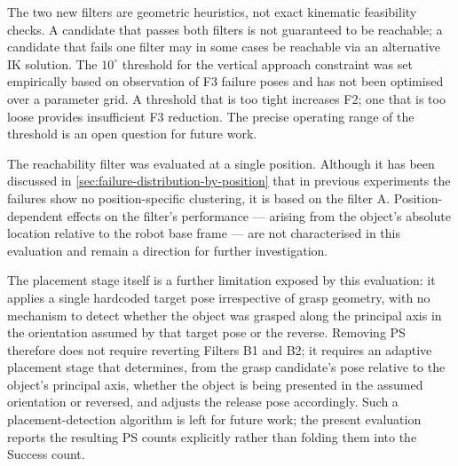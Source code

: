 \documentclass[12pt, a4paper]{report}
\begin{document}
The two new filters are geometric heuristics, not exact kinematic feasibility checks. A candidate that passes both filters is not guaranteed to be reachable; a candidate that fails one filter may in some cases be reachable via an alternative IK solution. The $10^{\circ}$ threshold for the vertical approach constraint was set empirically based on observation of F3 failure poses and has not been optimised over a parameter grid. A threshold that is too tight increases F2; one that is too loose provides insufficient F3 reduction. The precise operating range of the threshold is an open question for future work.

The reachability filter was evaluated at a single position. Although it has been discussed in \cref{sec:failure-distribution-by-position} that in previous experiments the failures show no position-specific clustering, it is based on the filter A. Position-dependent effects on the filter's performance — arising from the object's absolute location relative to the robot base frame — are not characterised in this evaluation and remain a direction for further investigation.

The placement stage itself is a further limitation exposed by this evaluation: it applies a single hardcoded target pose irrespective of grasp geometry, with no mechanism to detect whether the object was grasped along the principal axis in the orientation assumed by that target pose or the reverse. Removing PS therefore does not require reverting Filters B1 and B2; it requires an adaptive placement stage that determines, from the grasp candidate's pose relative to the object's principal axis, whether the object is being presented in the assumed orientation or reversed, and adjusts the release pose accordingly. Such a placement-detection algorithm is left for future work; the present evaluation reports the resulting PS counts explicitly rather than folding them into the Success count.
\end{document}
